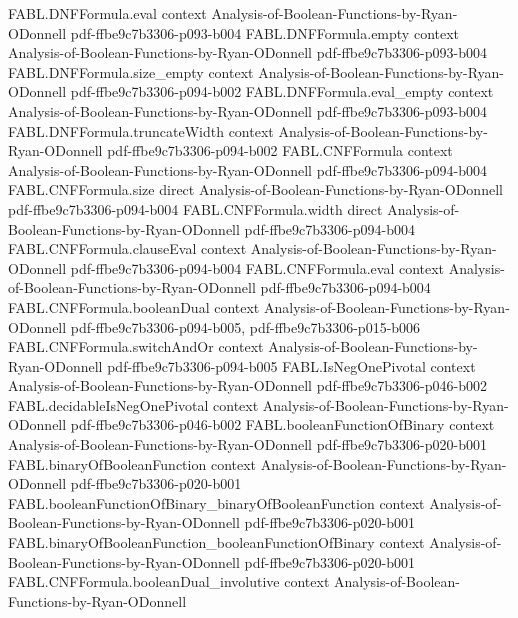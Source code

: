 \begin{theorem}
\proofstep
  {FABL.DNFFormula.eval}
  {context}
  {Analysis-of-Boolean-Functions-by-Ryan-ODonnell}
  {pdf-ffbe9c7b3306-p093-b004}
\proofstep
  {FABL.DNFFormula.empty}
  {context}
  {Analysis-of-Boolean-Functions-by-Ryan-ODonnell}
  {pdf-ffbe9c7b3306-p093-b004}
\proofstep
  {FABL.DNFFormula.size_empty}
  {context}
  {Analysis-of-Boolean-Functions-by-Ryan-ODonnell}
  {pdf-ffbe9c7b3306-p094-b002}
\proofstep
  {FABL.DNFFormula.eval_empty}
  {context}
  {Analysis-of-Boolean-Functions-by-Ryan-ODonnell}
  {pdf-ffbe9c7b3306-p093-b004}
\proofstep
  {FABL.DNFFormula.truncateWidth}
  {context}
  {Analysis-of-Boolean-Functions-by-Ryan-ODonnell}
  {pdf-ffbe9c7b3306-p094-b002}
\proofstep
  {FABL.CNFFormula}
  {context}
  {Analysis-of-Boolean-Functions-by-Ryan-ODonnell}
  {pdf-ffbe9c7b3306-p094-b004}
\proofstep
  {FABL.CNFFormula.size}
  {direct}
  {Analysis-of-Boolean-Functions-by-Ryan-ODonnell}
  {pdf-ffbe9c7b3306-p094-b004}
\proofstep
  {FABL.CNFFormula.width}
  {direct}
  {Analysis-of-Boolean-Functions-by-Ryan-ODonnell}
  {pdf-ffbe9c7b3306-p094-b004}
\proofstep
  {FABL.CNFFormula.clauseEval}
  {context}
  {Analysis-of-Boolean-Functions-by-Ryan-ODonnell}
  {pdf-ffbe9c7b3306-p094-b004}
\proofstep
  {FABL.CNFFormula.eval}
  {context}
  {Analysis-of-Boolean-Functions-by-Ryan-ODonnell}
  {pdf-ffbe9c7b3306-p094-b004}
\proofstep
  {FABL.CNFFormula.booleanDual}
  {context}
  {Analysis-of-Boolean-Functions-by-Ryan-ODonnell}
  {pdf-ffbe9c7b3306-p094-b005,
    pdf-ffbe9c7b3306-p015-b006}
\proofstep
  {FABL.CNFFormula.switchAndOr}
  {context}
  {Analysis-of-Boolean-Functions-by-Ryan-ODonnell}
  {pdf-ffbe9c7b3306-p094-b005}
\proofstep
  {FABL.IsNegOnePivotal}
  {context}
  {Analysis-of-Boolean-Functions-by-Ryan-ODonnell}
  {pdf-ffbe9c7b3306-p046-b002}
\proofstep
  {FABL.decidableIsNegOnePivotal}
  {context}
  {Analysis-of-Boolean-Functions-by-Ryan-ODonnell}
  {pdf-ffbe9c7b3306-p046-b002}
\proofstep
  {FABL.booleanFunctionOfBinary}
  {context}
  {Analysis-of-Boolean-Functions-by-Ryan-ODonnell}
  {pdf-ffbe9c7b3306-p020-b001}
\proofstep
  {FABL.binaryOfBooleanFunction}
  {context}
  {Analysis-of-Boolean-Functions-by-Ryan-ODonnell}
  {pdf-ffbe9c7b3306-p020-b001}
\proofstep
  {FABL.booleanFunctionOfBinary_binaryOfBooleanFunction}
  {context}
  {Analysis-of-Boolean-Functions-by-Ryan-ODonnell}
  {pdf-ffbe9c7b3306-p020-b001}
\proofstep
  {FABL.binaryOfBooleanFunction_booleanFunctionOfBinary}
  {context}
  {Analysis-of-Boolean-Functions-by-Ryan-ODonnell}
  {pdf-ffbe9c7b3306-p020-b001}
\proofstep
  {FABL.CNFFormula.booleanDual_involutive}
  {context}
  {Analysis-of-Boolean-Functions-by-Ryan-ODonnell}

\end{theorem}
